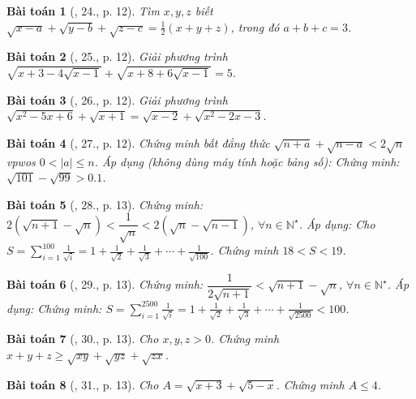 \documentclass{article}
\newtheorem{baitoan}{Bài toán}
\begin{document}
\begin{baitoan}[\cite{Tuyen_Toan_9}, 24., p. 12]
	Tìm $x,y,z$ biết $\sqrt{x - a} + \sqrt{y - b} + \sqrt{z - c} = \frac{1}{2}(x + y + z)$, trong đó $a + b + c = 3$.
\end{baitoan}

\begin{baitoan}[\cite{Tuyen_Toan_9}, 25., p. 12]
	Giải phương trình $\sqrt{x + 3 - 4\sqrt{x - 1}} + \sqrt{x + 8 + 6\sqrt{x - 1}} = 5$.
\end{baitoan}

\begin{baitoan}[\cite{Tuyen_Toan_9}, 26., p. 12]
	Giải phương trình $\sqrt{x^2 - 5x + 6} + \sqrt{x + 1} = \sqrt{x - 2} + \sqrt{x^2 - 2x - 3}$.
\end{baitoan}

\begin{baitoan}[\cite{Tuyen_Toan_9}, 27., p. 12]
	Chứng minh bất đẳng thức $\sqrt{n + a} + \sqrt{n - a} < 2\sqrt{n}$ vpwos $0 < |a|\le n$. Áp dụng (không dùng máy tính hoặc bảng số): Chứng minh: $\sqrt{101} - \sqrt{99} > 0.1$.
\end{baitoan}

\begin{baitoan}[\cite{Tuyen_Toan_9}, 28., p. 13]
	Chứng minh: $2(\sqrt{n + 1} - \sqrt{n}) < \dfrac{1}{\sqrt{n}} < 2(\sqrt{n} - \sqrt{n - 1})$, $\forall n\in\mathbb{N}^\star$. Áp dụng: Cho $S = \sum_{i=1}^{100} \frac{1}{\sqrt{i}} = 1 + \frac{1}{\sqrt{2}} + \frac{1}{\sqrt{3}} + \cdots + \frac{1}{\sqrt{100}}$. Chứng minh $18 < S < 19$.
\end{baitoan}

\begin{baitoan}[\cite{Tuyen_Toan_9}, 29., p. 13]
	Chứng minh: $\dfrac{1}{2\sqrt{n + 1}} < \sqrt{n + 1} - \sqrt{n}$, $\forall n\in\mathbb{N}^\star$. Áp dụng: Chứng minh: $S = \sum_{i=1}^{2500} \frac{1}{\sqrt{i}} = 1 + \frac{1}{\sqrt{2}} + \frac{1}{\sqrt{3}} + \cdots + \frac{1}{\sqrt{2500}} < 100$.
\end{baitoan}

\begin{baitoan}[\cite{Tuyen_Toan_9}, 30., p. 13]
	Cho $x,y,z > 0$. Chứng minh $x + y + z\ge\sqrt{xy} + \sqrt{yz} + \sqrt{zx}$.
\end{baitoan}

\begin{baitoan}[\cite{Tuyen_Toan_9}, 31., p. 13]
	Cho $A = \sqrt{x + 3} + \sqrt{5 - x}$. Chứng minh $A\le4$.
\end{baitoan}
\end{document}

